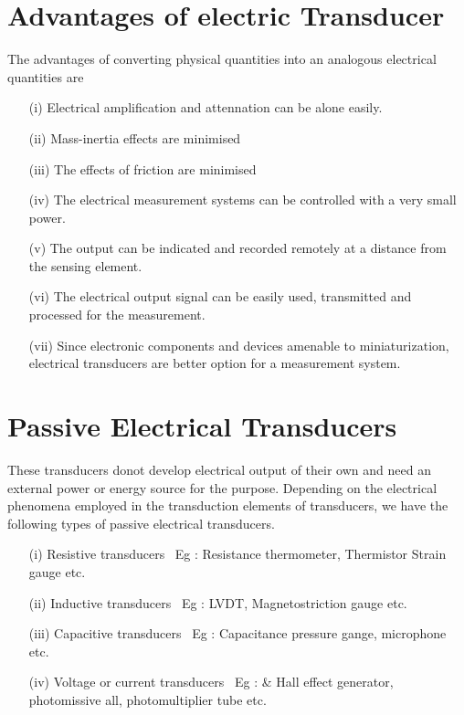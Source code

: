 \eject

\section{Advantages of electric Transducer}\label{sec9.5}

The advantages of converting physical quantities into an analogous
electrical quantities are
\begin{itemize}
\item[(i)] Electrical amplification and attennation can be alone easily.

\item[(ii)] Mass-inertia effects are minimised 

\item[(iii)] The effects of friction are minimised

\item[(iv)] The electrical measurement systems can be controlled with
  a very small power.

\item[(v)] The output can be indicated and recorded remotely at a
  distance from the sensing element.

\item[(vi)] The electrical output signal can be easily used,
  transmitted and processed for the measurement.

\item[(vii)] Since electronic components and devices amenable to
  miniaturization, electrical transducers are better option for a
  measurement system. 
\end{itemize}


\section{Passive Electrical Transducers}\label{sec9.6}

These transducers donot  develop electrical output of their own and
need an external power or energy source for the purpose. Depending on
the electrical phenomena employed in the transduction elements of
transducers, we have the following types of passive electrical
transducers.
\begin{itemize}
\item[(i)] Resistive transducers  ~Eg : Resistance thermometer,
Thermistor Strain gauge etc.

\item[(ii)] Inductive transducers ~Eg : LVDT, Magnetostriction gauge
etc. 

\item[(iii)] Capacitive transducers ~Eg : Capacitance pressure gange,
microphone etc.

\item[(iv)] Voltage or current transducers ~Eg : \& Hall effect
generator, photomissive all, photomultiplier tube etc.
\end{itemize}

